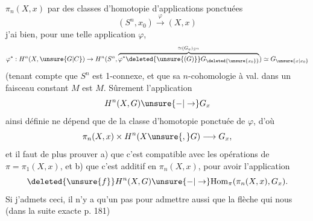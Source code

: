 $\pi_n(X,x)$ par des classes d'homotopie d'applications ponctuées
\[
(S^n,x_0)\xrightarrow{\varphi}(X,x)
\]
j'ai bien, pour une telle application $\varphi$,
\[
\varphi^*:H^n(X,\unsure{G|C})\to H^n(S^n,\overbrace{\varphi^*\deleted{\unsure{(G)}}G_{\deleted{\unsure{x_0}}}}^{\simeq(G_x)_{S^n}})\simeq G_{\unsure{x|x_0}}
\]
(tenant compte que $S^n$ est 1-connexe, et que sa $n$-cohomologie à val. dans un faisceau constant $M$ est $M$. Sûrement l'application
\[
H^n(X,G)\unsure{-|\to}G_x
\]
ainsi définie ne dépend que de la classe d'homotopie ponctuée de $\varphi$, d'où
\[
\pi_n(X,x)\times H^n(X\unsure{,}G)\longrightarrow G_x,
\]
et il faut de plus prouver a) que c'est compatible avec les opérations de $\pi=\pi_1(X,x)$, et b) que c'est additif en $\pi_n(X,x)$, pour avoir l'application 
\[
\deleted{\unsure{f}}H^n(X,G)\unsure{-|\to}\mathrm{Hom}_\pi(\pi_n(X,x),G_x).
\]
Si j'admets ceci, il n'y a qu'un pas pour admettre aussi que la flèche qui nous   (dans la suite exacte p. 181)
